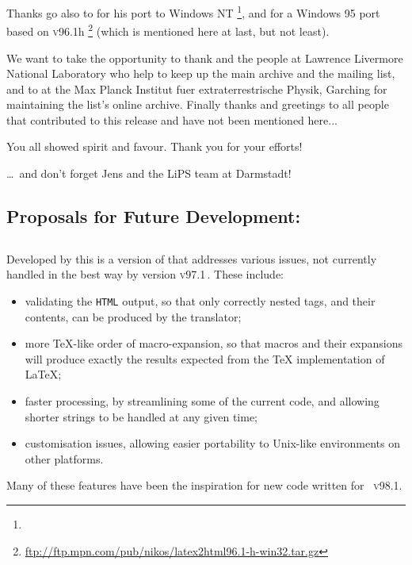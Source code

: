 \smallskip\noindent
Thanks go also to \Popineau{} for his port to Windows NT
\footnote{},
and \NikosDrakos{} for a Windows 95 port based on \textsc{v96.1}h
\footnote{\url{ftp://ftp.mpn.com/pub/nikos/latex2html96.1-h-win32.tar.gz}}
(which is mentioned here at last, but not least).

\medskip\noindent
We want to take the opportunity to thank \Nelson{} and the people at
Lawrence Livermore National Laboratory who help to keep up the
\latextohtml{} main archive and the mailing list, and to \Bohnet{} at
the Max Planck Institut fuer extraterrestrische Physik, Garching for
maintaining the list's online archive.
Finally thanks and greetings to all people that contributed to this
release and have not been mentioned here...

\medskip\noindent
You all showed spirit and favour. Thank you for your efforts!

\medskip
\begin{flushright}
\dots\ and don't forget Jens and the LiPS team at Darmstadt!
\end{flushright}

\clearpage
\subsection*{Proposals for Future Development:\label{future}}%



\subsection*{\latextohtmlNG}
Developed by \Hennecke\label{latex2htmlNG} this is a version of 
\latextohtml{} that addresses various issues,
not currently handled in the best way by version \textsc{v97.1}\,.
These include:
\begin{itemize}
\item validating the \texttt{HTML} output,
so that only correctly nested tags, and their contents,
can be produced by the translator;
%
\item more \TeX-like order of macro-expansion,
so that macros and their expansions will produce exactly
the results expected from the \TeX{} implementation of \LaTeX;
%
\item faster processing,
by streamlining some of the current \Perl{} code, and allowing
shorter strings to be handled at any given time;
%
\item customisation issues,
allowing easier portability to Unix-like environments on
other platforms.
%
\end{itemize}
Many of these features have been the inspiration for new code
written for \latextohtml~\textsc{v98.1}.

